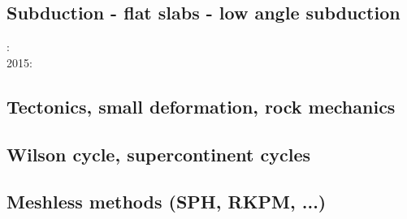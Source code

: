 \subsection*{Subduction - flat slabs - low angle subduction}

: \cite{cube11}\\
2015: \cite{gehm15}

\subsection*{Tectonics, small deformation, rock mechanics}

\cite{ilma93}
\cite{hept96}
\cite{lega12}

\subsection*{Wilson cycle, supercontinent cycles}

\cite{trry95}
\cite{zhzl07}
\cite{zhzm09}
\cite{begb19}


\subsection*{Meshless methods (SPH, RKPM, ...)}

\cite{febh05}
\cite{nifs15}




